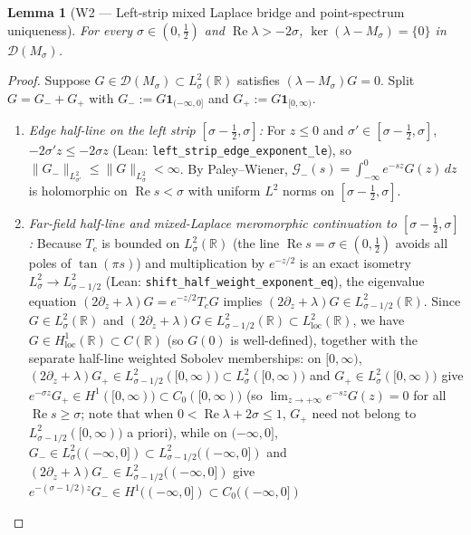 \documentclass[11pt,a4paper]{article}
\newtheorem{lem}{Lemma}[section]
\begin{document}
\begin{lem}[W2 --- Left-strip mixed Laplace bridge and point-spectrum uniqueness]\label{lem:app_w2}
For every $\sigma\in(0,\tfrac12)$ and $\operatorname{Re}\lambda>-2\sigma$, $\ker(\lambda-M_\sigma)=\{0\}$ in $\mathcal{D}(M_\sigma)$.
\end{lem}
\begin{proof}
Suppose $G\in\mathcal{D}(M_\sigma)\subset L^2_\sigma(\mathbb{R})$ satisfies $(\lambda-M_\sigma)G=0$.
Split $G=G_-+G_+$ with $G_-:=G\mathbf{1}_{(-\infty,0]}$ and $G_+:=G\mathbf{1}_{[0,\infty)}$.
\begin{enumerate}\setlength\itemsep{1pt}
\item \emph{Edge half-line on the left strip $[\sigma-\tfrac12,\sigma]$:}
  For $z\le 0$ and $\sigma'\in[\sigma-\tfrac12,\sigma]$, $-2\sigma' z\le -2\sigma z$ (Lean: \texttt{left\_strip\_edge\_exponent\_le}),
  so $\|G_-\|_{L^2_{\sigma'}}\le\|G\|_{L^2_\sigma}<\infty$. By Paley--Wiener, $\mathcal{G}_-(s)=\int_{-\infty}^0 e^{-sz}G(z)\,dz$
  is holomorphic on $\operatorname{Re}s<\sigma$ with uniform $L^2$ norms on $[\sigma-\tfrac12,\sigma]$.
\item \emph{Far-field half-line and mixed-Laplace meromorphic continuation to $[\sigma-\tfrac12,\sigma]$:}
  Because $T_c$ is bounded on $L^2_\sigma(\mathbb{R})$ (the line $\operatorname{Re}s=\sigma\in(0,\tfrac12)$ avoids all poles of $\tan(\pi s)$)
  and multiplication by $e^{-z/2}$ is an exact isometry $L^2_\sigma\to L^2_{\sigma-1/2}$ (Lean: \texttt{shift\_half\_weight\_exponent\_eq}),
  the eigenvalue equation $(2\partial_z+\lambda)G = e^{-z/2}T_c G$ implies $(2\partial_z+\lambda)G\in L^2_{\sigma-1/2}(\mathbb{R})$.
  Since $G\in L^2_\sigma(\mathbb{R})$ and $(2\partial_z+\lambda)G\in L^2_{\sigma-1/2}(\mathbb{R})\subset L^2_{\mathrm{loc}}(\mathbb{R})$,
  we have $G\in H^1_{\mathrm{loc}}(\mathbb{R})\subset C(\mathbb{R})$ (so $G(0)$ is well-defined), together with the separate
  half-line weighted Sobolev memberships:
  on $[0,\infty)$, $(2\partial_z+\lambda)G_+\in L^2_{\sigma-1/2}([0,\infty))\subset L^2_\sigma([0,\infty))$ and $G_+\in L^2_\sigma([0,\infty))$
  give $e^{-\sigma z}G_+\in H^1([0,\infty))\subset C_0([0,\infty))$ (so $\lim_{z\to+\infty}e^{-sz}G(z)=0$ for all $\operatorname{Re}s\ge\sigma$;
  note that when $0<\operatorname{Re}\lambda+2\sigma\le 1$, $G_+$ need not belong to $L^2_{\sigma-1/2}([0,\infty))$ a priori), while
  on $(-\infty,0]$, $G_-\in L^2_\sigma((-\infty,0])\subset L^2_{\sigma-1/2}((-\infty,0])$ and
  $(2\partial_z+\lambda)G_-\in L^2_{\sigma-1/2}((-\infty,0])$ give $e^{-(\sigma-1/2)z}G_-\in H^1((-\infty,0])\subset C_0((-\infty,0])$

\end{enumerate}
\end{proof}
\end{document}
